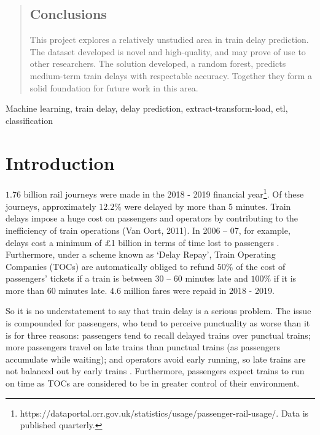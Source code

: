\documentclass[12pt,a4paper]{article}
\begin{document}
\begin{abstract}
\subsection{Conclusions}

This project explores a relatively unstudied area in train delay prediction. The dataset developed is novel and high-quality, and may prove of use to other researchers. The solution developed, a random forest, predicts medium-term train delays with respectable accuracy. Together they form a solid foundation for future work in this area.

\end{abstract}

\begin{keywords}
Machine learning, train delay, delay prediction, extract-transform-load, etl, classification
\end{keywords}

\clearpage
\section{Introduction}
\label{section:introduction}

$1.76$ billion rail journeys were made in the 2018 - 2019 financial year\footnote{https://dataportal.orr.gov.uk/statistics/usage/passenger-rail-usage/. Data is published quarterly.}. Of these journeys, approximately $12.2$\% were delayed by more than 5 minutes. Train delays impose a huge cost on passengers and operators by contributing to the inefficiency of train operations (Van Oort, 2011). In 2006 – 07, for example, delays cost a minimum of £1 billion in terms of time lost to passengers \cite{nao_2008}. Furthermore, under a scheme known as ‘Delay Repay’, Train Operating Companies (TOCs) are automatically obliged to refund $50\%$ of the cost of passengers’ tickets if a train is between 30 – 60 minutes late and $100\%$ if it is more than 60 minutes late. $4.6$ million fares were repaid in 2018 - 2019.

So it is no understatement to say that train delay is a serious problem. The issue is compounded for passengers, who tend to perceive punctuality as worse than it is for three reasons: passengers tend to recall delayed trains over punctual trains; more passengers travel on late trains than punctual trains (as passengers accumulate while waiting); and operators avoid early running, so late trains are not balanced out by early trains \cite[p.~130]{harris_godward_1992}. Furthermore, passengers expect trains to run on time as TOCs are considered to be in greater control of their environment.
\end{document}
